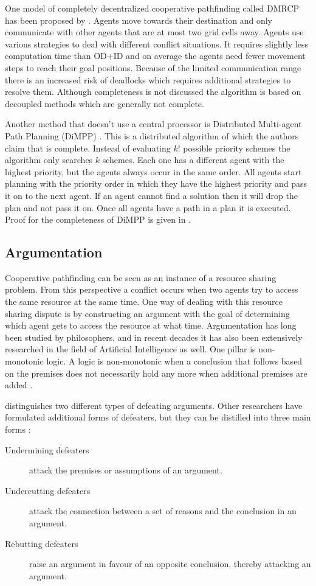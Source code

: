 One model of completely decentralized cooperative pathfinding called DMRCP has
been proposed by \citep{wei2016}. Agents move towards their destination and only
communicate with other agents that are at most two grid cells away. Agents use 
various strategies to deal with different conflict situations. It requires 
slightly less computation time than OD+ID and on average the agents need fewer 
movement steps to reach their goal positions. Because of the limited 
communication range there is an increased risk of deadlocks which requires 
additional strategies to resolve them. Although completeness is not discussed 
the algorithm is based on decoupled methods which are generally not complete.

Another method that doesn't use a central processor is Distributed Multi-agent
Path Planning (DiMPP) \citep{chouhan2017}. This is a distributed algorithm of 
which the authors claim that is complete. Instead of evaluating $k!$ possible 
priority schemes the algorithm only searches $k$ schemes. Each one has a 
different agent with the highest priority, but the agents always occur in the 
same order. All agents start planning with the priority order in which they 
have the highest priority and pass it on to the next agent. If an agent cannot 
find a solution then it will drop the plan and not pass it on. Once all agents 
have a path in a plan it is executed. Proof for the completeness of DiMPP is 
given in \cite[subsection 5.1]{chouhan2017}.

\subsection{Argumentation}
Cooperative pathfinding can be seen as an instance of a resource sharing
problem. From this perspective a conflict occurs when two agents try to access
the same resource at the same time. One way of dealing with this resource
sharing dispute is by constructing an argument with the goal of determining
which agent gets to access the resource at what time. Argumentation has long
been studied by philosophers, and in recent decades it has also been
extensively researched in the field of Artificial Intelligence as well. One 
pillar is non-monotonic logic. A logic is non-monotonic when a conclusion that 
follows based on the premises does not necessarily hold any more when 
additional premises are added \citep{vaneemeren2014,modgil2013}.

\citep{pollock1995} distinguishes two different types of defeating arguments. 
Other researchers have formulated additional forms of defeaters, but they can 
be distilled into three main forms \citep{vaneemeren2014}:
\begin{description}
	\item[Undermining defeaters] attack the premises or assumptions of an
	argument.
	\item[Undercutting defeaters] attack the connection between a set of
	reasons and the conclusion in an argument.
	\item[Rebutting defeaters] raise an argument in favour of an opposite
	conclusion, thereby attacking an argument.
\end{description}

